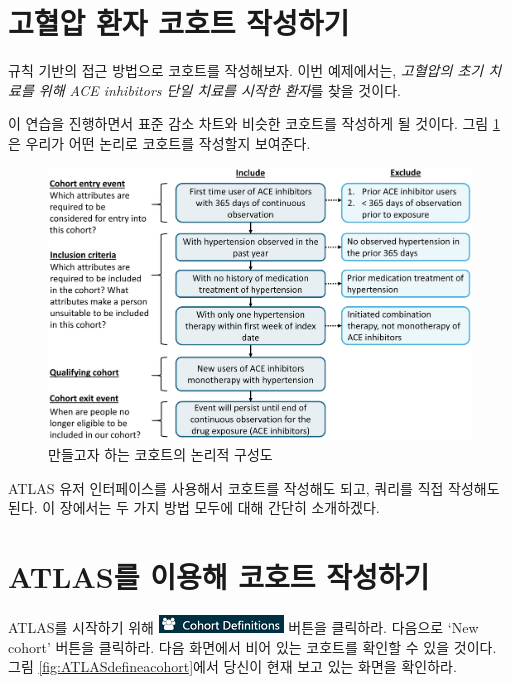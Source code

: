 \documentclass[11pt]{book}
\theoremstyle{definition}
\theoremstyle{definition}
\theoremstyle{definition}
\theoremstyle{remark}
\begin{document}
\section{고혈압 환자 코호트 작성하기}\label{---}

규칙 기반의 접근 방법으로 코호트를 작성해보자. 이번 예제에서는,
\emph{고혈압의 초기 치료를 위해 ACE inhibitors 단일 치료를 시작한
환자}를 찾을 것이다.

이 연습을 진행하면서 표준 감소 차트와 비슷한 코호트를 작성하게 될
것이다. 그림 \ref{fig:CohortPractice}은 우리가 어떤 논리로 코호트를
작성할지 보여준다.

\begin{figure}

{\centering \includegraphics[width=1\linewidth]{images/Cohorts/CohortPractice} 

}

\caption{만들고자 하는 코호트의 논리적 구성도}\label{fig:CohortPractice}
\end{figure}

ATLAS 유저 인터페이스를 사용해서 코호트를 작성해도 되고, 쿼리를 직접
작성해도 된다. 이 장에서는 두 가지 방법 모두에 대해 간단히 소개하겠다.

\section{ATLAS를 이용해 코호트 작성하기}\label{atlas---}

ATLAS를 시작하기 위해
\includegraphics{images/Cohorts/cohortdefinition.png} 버튼을 클릭하라.
다음으로 `New cohort' 버튼을 클릭하라. 다음 화면에서 비어 있는 코호트를
확인할 수 있을 것이다. 그림 \ref{fig:ATLASdefineacohort}에서 당신이 현재
보고 있는 화면을 확인하라.
\end{document}
